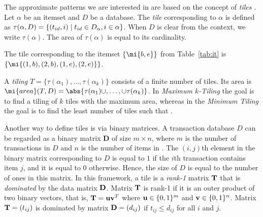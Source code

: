 The approximate patterns we are interested in are based on the concept of \emph{tiles} \parencite{tiling}.
Let $\alpha$ be an itemset and $D$ be a database. The \emph{tile} corresponding to
$\alpha$ is defined as $\tau(\alpha,D)=\{(t_{id},i)\mid t_{id} \in D_{\alpha}, i\in \alpha\}$. When $D$ is clear from the context, we write $\tau(\alpha)$.  The area of $\tau(\alpha)$ is equal to its cardinality.


\begin{example}
  \label{ex:tile}
The tile corresponding to the itemset $\{\mi{b,e}\}$ from Table~\ref{tab:it} is $\{\mi{(1,b),(2,b), (1,e), (2,e)}\}$.
\end{example}

A \emph{tiling} $T = \{\tau(\alpha_1),\dotsc, \tau(\alpha_k)\}$ consists of a finite number of tiles. Its area is $\mi{area}(T,D)=\abs{\tau(\alpha_1) \cup,\dotsc,\cup \tau(\alpha_k)}$. In \emph{Maximum $k$-Tiling} the goal is to find a tiling of $k$ tiles with the maximum area, whereas in the \emph{Minimum Tiling} the goal is to find the least number of tiles such that  \parencite{tiling}. 


Another way to define tiles is via binary matrices. A transaction database $D$ can be regarded as a binary matrix $\mathbf{D}$ of size
$m \times n$, where $m$ is the number of transactions in
$D$ and $n$ is the number of items in \revision{$\cI$}. The $(i, j)$th element in the binary matrix corresponding to
$D$ is equal to $1$ if the $i$th transaction contains item
$j$, and it is equal to $0$ otherwise. Hence, the size
of $D$ is equal to the number of ones in this matrix. In this framework, a tile is a \emph{rank-1} matrix $\mathbf{T}$ that is \emph{dominated} by the data matrix $\mathbf{D}$. Matrix $\mathbf{T}$ is rank-1 if it is an outer product of two binary vectors, that is, $\mathbf{T} = \mathbf{u}\mathbf{v}^T$ where $\mathbf{u}\in\{0,1\}^{m}$ and $\mathbf{v}\in\{0,1\}^n$. Matrix $\mathbf{T}=(t_{ij})$ is dominated by matrix $\mathbf{D}=(d_{ij})$ if $t_{ij} \leq d_{ij}$ for all $i$ and $j$. 

